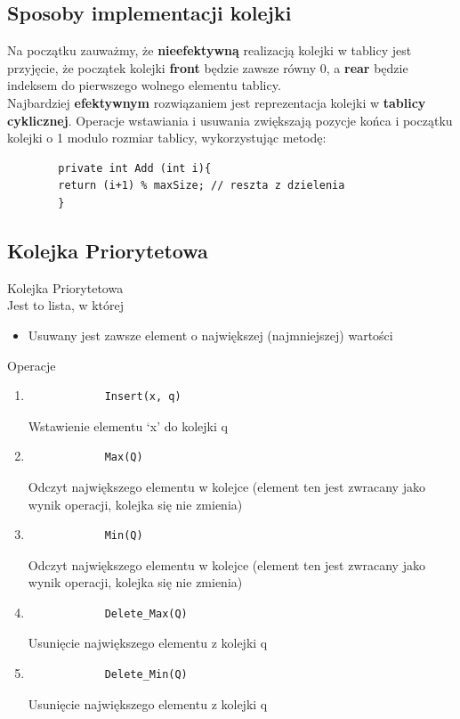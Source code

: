 \documentclass[12pt]{article}
\begin{document}
    \subsection{Sposoby implementacji kolejki}

    Na początku zauważmy, że \textbf{nieefektywną} realizacją kolejki w tablicy jest przyjęcie, że
    początek kolejki \textbf{front} będzie zawsze równy 0, a \textbf{rear} będzie indeksem do pierwszego
    wolnego elementu tablicy.\\


    Najbardziej \textbf{efektywnym} rozwiązaniem jest reprezentacja kolejki w \textbf{tablicy cyklicznej}.
    Operacje wstawiania i usuwania zwiększają pozycje końca i początku kolejki o 1 modulo
    rozmiar tablicy, wykorzystując metodę:
    \begin{verbatim}
        private int Add (int i){
        return (i+1) % maxSize; // reszta z dzielenia
        }
    \end{verbatim}

    \subsection{Kolejka Priorytetowa}
    \begin{definition}
        Kolejka Priorytetowa\\
        Jest to lista, w której
        \begin{itemize}
            \item Usuwany jest zawsze element o największej (najmniejszej) wartości
        \end{itemize}
    \end{definition}

    Operacje
    \begin{enumerate}
        \item
        \begin{verbatim}
            Insert(x, q)
        \end{verbatim}
        Wstawienie elementu ‘x’ do kolejki q
        \item
        \begin{verbatim}
            Max(Q)
        \end{verbatim}
        Odczyt największego elementu w kolejce (element ten jest zwracany jako wynik operacji, kolejka się nie zmienia)
        \item
        \begin{verbatim}
            Min(Q)
        \end{verbatim}
        Odczyt największego elementu w kolejce (element ten jest zwracany jako wynik operacji, kolejka się nie zmienia)
        \item
        \begin{verbatim}
            Delete_Max(Q)
        \end{verbatim}
        Usunięcie największego elementu z kolejki q
        \item
        \begin{verbatim}
            Delete_Min(Q)
        \end{verbatim}
        Usunięcie największego elementu z kolejki q
    \end{enumerate}
\end{document}
